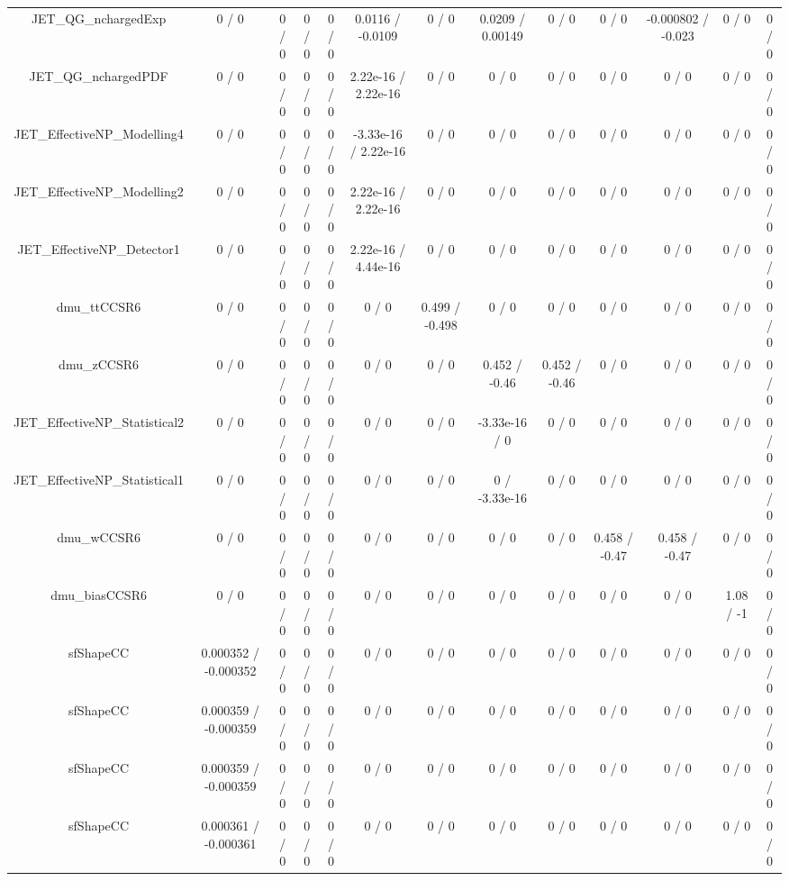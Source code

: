 \documentclass[10pt]{article}
\begin{document}
\begin{table}[htbp]
\begin{center}
\begin{tabular}{|c|c|c|c|c|c|c|c|c|c|c|c|c|}
  JET_QG_nchargedExp & 0 / 0 & 0 / 0 & 0 / 0 & 0 / 0 & 0.0116 / -0.0109 & 0 / 0 & 0.0209 / 0.00149 & 0 / 0 & 0 / 0 & -0.000802 / -0.023 & 0 / 0 & 0 / 0 \\ 
  JET_QG_nchargedPDF & 0 / 0 & 0 / 0 & 0 / 0 & 0 / 0 & 2.22e-16 / 2.22e-16 & 0 / 0 & 0 / 0 & 0 / 0 & 0 / 0 & 0 / 0 & 0 / 0 & 0 / 0 \\ 
  JET_EffectiveNP_Modelling4 & 0 / 0 & 0 / 0 & 0 / 0 & 0 / 0 & -3.33e-16 / 2.22e-16 & 0 / 0 & 0 / 0 & 0 / 0 & 0 / 0 & 0 / 0 & 0 / 0 & 0 / 0 \\ 
  JET_EffectiveNP_Modelling2 & 0 / 0 & 0 / 0 & 0 / 0 & 0 / 0 & 2.22e-16 / 2.22e-16 & 0 / 0 & 0 / 0 & 0 / 0 & 0 / 0 & 0 / 0 & 0 / 0 & 0 / 0 \\ 
  JET_EffectiveNP_Detector1 & 0 / 0 & 0 / 0 & 0 / 0 & 0 / 0 & 2.22e-16 / 4.44e-16 & 0 / 0 & 0 / 0 & 0 / 0 & 0 / 0 & 0 / 0 & 0 / 0 & 0 / 0 \\ 
  dmu_ttCCSR6 & 0 / 0 & 0 / 0 & 0 / 0 & 0 / 0 & 0 / 0 & 0.499 / -0.498 & 0 / 0 & 0 / 0 & 0 / 0 & 0 / 0 & 0 / 0 & 0 / 0 \\ 
  dmu_zCCSR6 & 0 / 0 & 0 / 0 & 0 / 0 & 0 / 0 & 0 / 0 & 0 / 0 & 0.452 / -0.46 & 0.452 / -0.46 & 0 / 0 & 0 / 0 & 0 / 0 & 0 / 0 \\ 
  JET_EffectiveNP_Statistical2 & 0 / 0 & 0 / 0 & 0 / 0 & 0 / 0 & 0 / 0 & 0 / 0 & -3.33e-16 / 0 & 0 / 0 & 0 / 0 & 0 / 0 & 0 / 0 & 0 / 0 \\ 
  JET_EffectiveNP_Statistical1 & 0 / 0 & 0 / 0 & 0 / 0 & 0 / 0 & 0 / 0 & 0 / 0 & 0 / -3.33e-16 & 0 / 0 & 0 / 0 & 0 / 0 & 0 / 0 & 0 / 0 \\ 
  dmu_wCCSR6 & 0 / 0 & 0 / 0 & 0 / 0 & 0 / 0 & 0 / 0 & 0 / 0 & 0 / 0 & 0 / 0 & 0.458 / -0.47 & 0.458 / -0.47 & 0 / 0 & 0 / 0 \\ 
  dmu_biasCCSR6 & 0 / 0 & 0 / 0 & 0 / 0 & 0 / 0 & 0 / 0 & 0 / 0 & 0 / 0 & 0 / 0 & 0 / 0 & 0 / 0 & 1.08 / -1 & 0 / 0 \\ 
  sfShapeCC & 0.000352 / -0.000352 & 0 / 0 & 0 / 0 & 0 / 0 & 0 / 0 & 0 / 0 & 0 / 0 & 0 / 0 & 0 / 0 & 0 / 0 & 0 / 0 & 0 / 0 \\ 
  sfShapeCC & 0.000359 / -0.000359 & 0 / 0 & 0 / 0 & 0 / 0 & 0 / 0 & 0 / 0 & 0 / 0 & 0 / 0 & 0 / 0 & 0 / 0 & 0 / 0 & 0 / 0 \\ 
  sfShapeCC & 0.000359 / -0.000359 & 0 / 0 & 0 / 0 & 0 / 0 & 0 / 0 & 0 / 0 & 0 / 0 & 0 / 0 & 0 / 0 & 0 / 0 & 0 / 0 & 0 / 0 \\ 
  sfShapeCC & 0.000361 / -0.000361 & 0 / 0 & 0 / 0 & 0 / 0 & 0 / 0 & 0 / 0 & 0 / 0 & 0 / 0 & 0 / 0 & 0 / 0 & 0 / 0 & 0 / 0 \\ 

\end{tabular}
\end{center}
\end{table}
\end{document}

